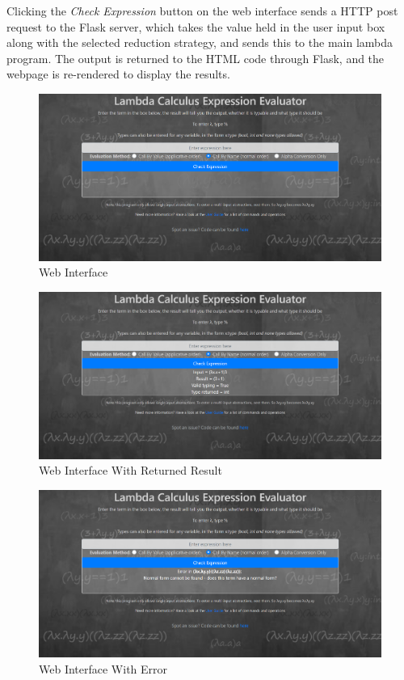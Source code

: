 \documentclass[a4paper,12pt]{report}
\begin{document}
Clicking the \textit{Check Expression} button on the web interface sends a HTTP post request to the Flask server, which takes the value held in the user input box along with the selected reduction strategy, and sends this to the main lambda program. The output is returned to the HTML code through Flask, and the webpage is re-rendered to display the results.\\

\begin{figure}[p]
	\includegraphics[scale=0.3]{images/web_interface_no_input}
	\centering
	\caption{Web Interface}
	\label{web_interface_no_input}
\end{figure}

\begin{figure}[p]
	\centering
	\includegraphics[scale=0.3]{images/web_interface_input}
	\caption{Web Interface With Returned Result}
	\label{web_interface_input}
\end{figure}

\begin{figure}[p]
	\centering
	\includegraphics[scale=0.3]{images/web_interface_error}
	\caption{Web Interface With Error}
	\label{web_interface_error}
\end{figure}
\end{document}
